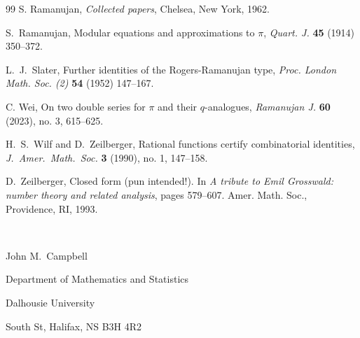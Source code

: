 \documentclass[12pt]{article}
\begin{document}
\begin{thebibliography}{99}
 S. Ramanujan, 
 {\it Collected papers}, 
 Chelsea, New York, 1962. 

 S.\ Ramanujan, 
 Modular equations and approximations to $\pi$, 
 {\it Quart. J.} {\bf 45} (1914) 350--372. 

 L.\ J.\ Slater, 
 Further identities of the {R}ogers-{R}amanujan type, 
 {\it Proc. London Math. Soc. (2)} {\bf 54} (1952) 147--167. 

 C. Wei, 
 On two double series for {$\pi$} and their {$q$}-analogues, 
 \emph{Ramanujan J.} {\bf 60} (2023), no. 3, 
 615--625. 
 
 H.\ S.\ Wilf and D.\ Zeilberger, 
 Rational functions certify combinatorial identities, 
 \emph{J.\ Amer.\ Math.\ Soc.} {\bf 3} (1990), no. 1, 
 147--158. 

 D.\ Zeilberger, 
 Closed form (pun intended!). 
 In \emph{A tribute to {E}mil {G}rosswald: number theory and related analysis}, 
 pages 579--607. Amer. Math. Soc., Providence, RI, 1993. 
 
\end{thebibliography}

 \

\noindent John M.\ Campbell

\vspace{0.1in}

\noindent Department of Mathematics and Statistics

\noindent Dalhousie University

 South St, Halifax, NS B3H 4R2

\vspace{0.1in}

\end{document}

